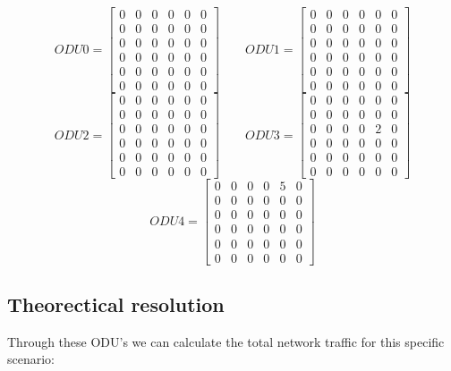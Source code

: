 \[
ODU0=
\begin{bmatrix}
0 & 0 & 0 & 0 & 0 & 0 \\
0 & 0 & 0 & 0 & 0 & 0 \\
0 & 0 & 0 & 0 & 0 & 0 \\
0 & 0 & 0 & 0 & 0 & 0 \\
0 & 0 & 0 & 0 & 0 & 0 \\
0 & 0 & 0 & 0 & 0 & 0
\end{bmatrix}
\qquad ODU1=
\begin{bmatrix}
0 & 0 & 0 & 0 & 0 & 0 \\
0 & 0 & 0 & 0 & 0 & 0 \\
0 & 0 & 0 & 0 & 0 & 0 \\
0 & 0 & 0 & 0 & 0 & 0 \\
0 & 0 & 0 & 0 & 0 & 0 \\
0 & 0 & 0 & 0 & 0 & 0
\end{bmatrix}
\]
\[
ODU2=
\begin{bmatrix}
0 & 0 & 0 & 0 & 0 & 0 \\
0 & 0 & 0 & 0 & 0 & 0 \\
0 & 0 & 0 & 0 & 0 & 0 \\
0 & 0 & 0 & 0 & 0 & 0 \\
0 & 0 & 0 & 0 & 0 & 0 \\
0 & 0 & 0 & 0 & 0 & 0
\end{bmatrix}
\qquad ODU3=
\begin{bmatrix}
0 & 0 & 0 & 0 & 0 & 0 \\
0 & 0 & 0 & 0 & 0 & 0 \\
0 & 0 & 0 & 0 & 2 & 0 \\
0 & 0 & 0 & 0 & 0 & 0 \\
0 & 0 & 0 & 0 & 0 & 0 \\
0 & 0 & 0 & 0 & 0 & 0
\end{bmatrix}
\]
\[
ODU4=
\begin{bmatrix}
0 & 0 & 0 & 0 & 5 & 0 \\
0 & 0 & 0 & 0 & 0 & 0 \\
0 & 0 & 0 & 0 & 0 & 0 \\
0 & 0 & 0 & 0 & 0 & 0 \\
0 & 0 & 0 & 0 & 0 & 0 \\
0 & 0 & 0 & 0 & 0 & 0
\end{bmatrix}
\]
\subsection{Theorectical resolution}
\vspace{17pt}
Through these ODU's we can calculate the total network traffic for this specific scenario:\\

